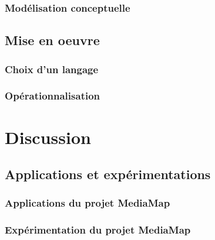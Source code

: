 \section{Modélisation conceptuelle}\label{sec:concept}

\chapter{Mise en oeuvre}\label{chap:op}
\minitoc
\section{Choix d'un langage}\label{sec:ln}
\section{Opérationnalisation}\label{sec:op}




\part*{Discussion}
\chapter{Applications et expérimentations}\label{chap:app}
\minitoc
\section{Applications du projet MediaMap}\label{sec:app}
\section{Expérimentation du projet MediaMap}\label{sec:xp}

